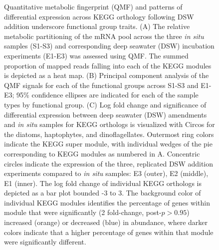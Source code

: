 \begin{figure}[p!]
    \caption[Quantitative metabolic fingerprint (QMF) and patterns of differential expression across KEGG orthology following DSW addition underscore functional group traits]{Quantitative metabolic fingerprint (QMF) and patterns of differential expression across KEGG orthology following DSW addition underscore functional group traits. (A) The relative metabolic partitioning of the mRNA pool across the three \textit{in situ} samples (S1-S3) and corresponding deep seawater (DSW) incubation experiments (E1-E3) was assessed using QMF. The summed proportion of mapped reads falling into each of the KEGG modules is depicted as a heat map. (B) Principal component analysis of the QMF signals for each of the functional groups across S1-S3 and E1-E3; 95\% confidence ellipses are indicated for each of the sample types by functional group. (C) Log fold change and significance of differential expression between deep seawater (DSW) amendments and \textit{in situ} samples for KEGG orthologs is visualized with Circos \citep{Krzywinski2009} for the diatoms, haptophytes, and dinoflagellates. Outermost ring colors indicate the KEGG super module, with individual wedges of the pie corresponding to KEGG modules as numbered in A. Concentric circles indicate the expression of the three, replicated DSW addition experiments compared to \textit{in situ} samples: E3 (outer), E2 (middle), E1 (inner). The log fold change of individual KEGG orthologs is depicted as a bar plot bounded -3 to 3. The background color of individual KEGG modules identifies the percentage of genes within module that were significantly (2 fold-change, post-$p > 0.95$) increased (orange) or decreased (blue) in abundance, where darker colors indicate that a higher percentage of genes within that module were significantly different.}
  \label{fig:c4f2}

\end{figure}

